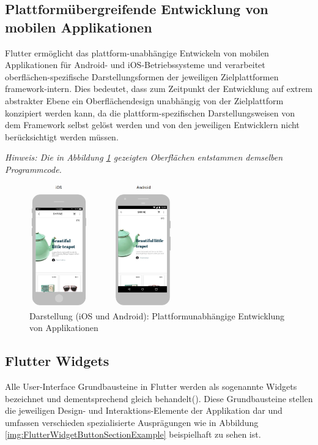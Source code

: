 \documentclass[bibliography=totoc,listof=totoc,BCOR=5mm,DIV=12,oneside]{scrbook}
\begin{document}
\subsection{Plattformübergreifende Entwicklung von mobilen Applikationen}
\par Flutter ermöglicht das plattform-unabhängige Entwickeln von mobilen Applikationen für Android- und iOS-Betriebssysteme und verarbeitet oberflächen-spezifische Darstellungsformen der jeweiligen Zielplattformen framework-intern. Dies bedeutet, dass zum Zeitpunkt der Entwicklung auf extrem abstrakter Ebene ein Oberflächendesign unabhängig von der Zielplattform konzipiert werden kann, da die plattform-spezifischen Darstellungsweisen von dem Framework selbst gelöst werden und von den jeweiligen Entwicklern nicht berücksichtigt werden müssen. 
\par \bigskip \textit{Hinweis: Die in Abbildung \ref{img:FlutterVisualisierungiOSAndoid} gezeigten Oberflächen entstammen demselben Programmcode.}

\bigskip
\begin{figure}[H]
	\centering
	\includegraphics[width=0.55\textwidth, keepaspectratio]{Bilder/PlattformUebergreifendDesign.png}
	\caption{Darstellung (iOS und Android): Plattformunabhängige Entwicklung von Applikationen \cite[What is Flutter?]{Flu8}}
	\label{img:FlutterVisualisierungiOSAndoid}
\end{figure}

\newpage
\subsection{Flutter Widgets}
\par Alle User-Interface Grundbausteine in Flutter werden als sogenannte Widgets bezeichnet und dementsprechend gleich behandelt(\cite{Flu5}). Diese Grundbausteine stellen die jeweiligen Design- und Interaktions-Elemente der Applikation dar und umfassen verschieden spezialisierte Ausprägungen wie in Abbildung \ref{img:FlutterWidgetButtonSectionExample} beispielhaft zu sehen ist.
\end{document}
